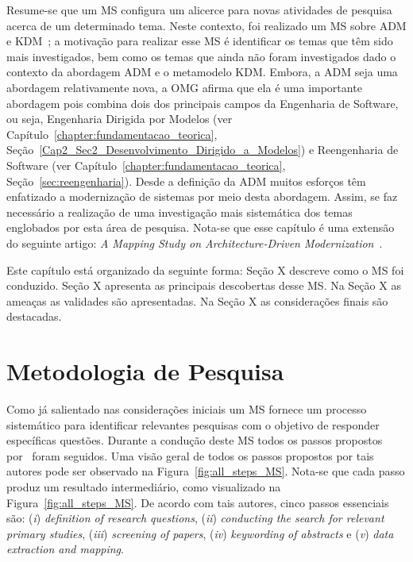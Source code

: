 Resume-se que um MS configura um alicerce para novas atividades de pesquisa acerca de um determinado tema. Neste contexto, foi realizado um MS sobre ADM e KDM~\cite{durelli_systematic_mapping}; a motivação para realizar esse MS é identificar os temas que têm sido mais investigados, bem como os temas que ainda não foram investigados dado o contexto da abordagem ADM e o metamodelo KDM. Embora, a ADM seja uma abordagem relativamente nova, a OMG afirma que ela é uma importante abordagem pois combina dois dos principais campos da Engenharia de Software, ou seja, Engenharia Dirigida por Modelos (ver Capítulo~\ref{chapter:fundamentacao_teorica}, Seção~\ref{Cap2_Sec2_Desenvolvimento_Dirigido_a_Modelos}) e Reengenharia de Software (ver Capítulo~\ref{chapter:fundamentacao_teorica}, Seção~\ref{sec:reengenharia}). Desde a definição da ADM muitos esforços têm enfatizado a modernização de sistemas por meio desta abordagem. Assim, se faz necessário a realização de uma investigação mais sistemática dos temas englobados por esta área de pesquisa. Nota-se que esse capítulo é uma extensão do seguinte artigo: \textit{A Mapping Study on Architecture-Driven Modernization}~\cite{durelli_systematic_mapping}.


Este capítulo está organizado da seguinte forma: Seção X descreve como o MS foi conduzido. Seção X apresenta as principais descobertas desse MS. Na Seção X as ameaças as validades são apresentadas. Na Seção X as considerações finais são destacadas.

\section{Metodologia de Pesquisa}\label{sec:metodologia_pesquisa}

Como já salientado nas considerações iniciais um MS fornece um processo sistemático para identificar relevantes pesquisas com o objetivo de responder específicas questões. Durante a condução deste MS todos os passos propostos por~ foram seguidos. Uma visão geral de todos os passos propostos por tais autores pode ser observado na Figura~\ref{fig:all_steps_MS}. Nota-se que cada passo produz um resultado intermediário, como visualizado na Figura~\ref{fig:all_steps_MS}. De acordo com tais autores, cinco passos essenciais são: (\textit{i}) \textit{definition of research questions}, (\textit{ii}) \textit{conducting the search for relevant primary studies}, (\textit{iii}) \emph{screening} \textit{of papers}, (\textit{iv}) \emph{keywording} \textit{of abstracts} e (\textit{v}) \textit{data extraction and mapping}. 

